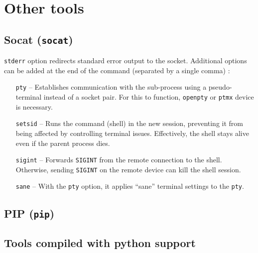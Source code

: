 


\section{Other tools}

\subsection{Socat (\texttt{socat})}


\texttt{stderr} option redirects standard error output to the socket. Additional options can be added at the end of the command (separated by a single comma) \cite{socat-man}:

\setlength{\leftmargini}{5em}
\begin{itemize}
\item[\texttt{pty} --] Establishes communication with the sub-process using a pseudo-terminal instead of a socket pair. For this to function, \texttt{openpty} or \texttt{ptmx} device is necessary.
\item[\texttt{setsid} --] Runs the command (shell) in the new session, preventing it from being affected by controlling terminal issues. Effectively, the shell stays alive even if the parent process dies.
\item[\texttt{sigint} --] Forwards \texttt{SIGINT} from the remote connection to the shell. Otherwise, sending \texttt{SIGINT} on the remote device can kill the shell session.
\item[\texttt{sane} --] With the \texttt{pty} option, it applies ``sane'' terminal settings to the \texttt{pty}.
\end{itemize}
\setlength{\leftmargini}{2.5em}


\subsection{PIP (\texttt{pip})}





\subsection{Tools compiled with python support}

